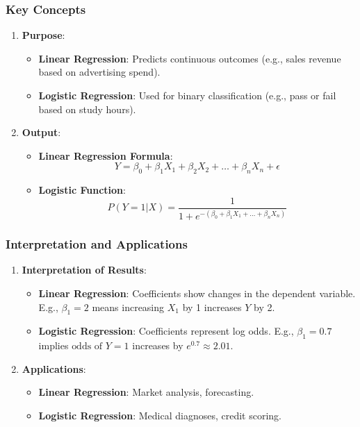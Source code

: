 \documentclass[aspectratio=169]{beamer}
\begin{document}
\begin{frame}[fragile]
    \frametitle{Key Concepts}
    \begin{enumerate}
        \item \textbf{Purpose}:
        \begin{itemize}
            \item \textbf{Linear Regression}: Predicts continuous outcomes (e.g., sales revenue based on advertising spend).
            \item \textbf{Logistic Regression}: Used for binary classification (e.g., pass or fail based on study hours).
        \end{itemize}

        \item \textbf{Output}:
        \begin{itemize}
            \item \textbf{Linear Regression Formula}:
            \begin{equation}
                Y = \beta_0 + \beta_1X_1 + \beta_2X_2 + \ldots + \beta_nX_n + \epsilon
            \end{equation}
            \item \textbf{Logistic Function}:
            \begin{equation}
                P(Y=1 | X) = \frac{1}{1 + e^{-(\beta_0 + \beta_1X_1 + \ldots + \beta_nX_n)}}
            \end{equation}
        \end{itemize}
    \end{enumerate}
\end{frame}

\begin{frame}[fragile]
    \frametitle{Interpretation and Applications}
    \begin{enumerate}
        \item \textbf{Interpretation of Results}:
        \begin{itemize}
            \item \textbf{Linear Regression}: Coefficients show changes in the dependent variable. E.g., $\beta_1 = 2$ means increasing $X_1$ by 1 increases $Y$ by 2.
            \item \textbf{Logistic Regression}: Coefficients represent log odds. E.g., $\beta_1 = 0.7$ implies $\text{odds of } Y=1$ increases by $e^{0.7} \approx 2.01$.
        \end{itemize}

        \item \textbf{Applications}:
        \begin{itemize}
            \item \textbf{Linear Regression}: Market analysis, forecasting.
            \item \textbf{Logistic Regression}: Medical diagnoses, credit scoring.
        \end{itemize}
    \end{enumerate}
\end{frame}
\end{document}
